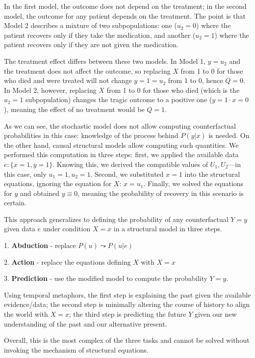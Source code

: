 \documentclass[fleqn]{article}
\numberwithin{equation}{section}
\numberwithin{theorem}{section}
\numberwithin{figure}{section}
\numberwithin{lemma}{section}
\numberwithin{corollary}{section}
\begin{document}
In the first model, the outcome does not depend on the treatment; in the second model, the outcome for any patient depends on the treatment. The point is that Model 2 describes a mixture of two subpopulations: one ($u_2 = 0$) where the patient recovers only if they take the medication, and another ($u_2 = 1$) where the patient recovers only if they are not given the medication.

The treatment effect differs between these two models. In Model 1, $y = u_2$ and the treatment does not affect the outcome, so replacing $X$ from 1 to 0 for those who died and were treated will not change $y = 1 = u_2$ from 1 to 0, hence $Q = 0$. In Model 2, however, replacing $X$ from 1 to 0 for those who died (which is the $u_2 = 1$ subpopulation) changes the tragic outcome to a positive one ($y = 1 \cdot x = 0$), meaning the effect of no treatment would be $Q = 1$.

As we can see, the stochastic model does not allow computing counterfactual probabilities in this case: knowledge of the process behind $P(y|x)$ is needed. On the other hand, causal structural models allow computing such quantities. We performed this computation in three steps: first, we applied the available data $e: \{x=1, y=1\}$. Knowing this, we derived the compatible values of $U_1, U_2$—in this case, only $u_1 = 1, u_2 = 1$. Second, we substituted $x=1$ into the structural equations, ignoring the equation for $X$: $x = u_1$. Finally, we solved the equations for $y$ and obtained $y \equiv 0$, meaning the probability of recovery in this scenario is certain.

This approach generalizes to defining the probability of any counterfactual $Y = y$ given data $e$ under condition $X=x$ in a structural model in three steps.

1. \textbf{Abduction} - replace $P(u) \leadsto P(u|e)$

2. \textbf{Action} - replace the equations defining $X$ with $X=x$

3. \textbf{Prediction} - use the modified model to compute the probability $Y = y$.

Using temporal metaphors, the first step is explaining the past given the available evidence/data; the second step is minimally altering the course of history to align the world with $X = x$; the third step is predicting the future $Y$ given our new understanding of the past and our alternative present.

Overall, this is the most complex of the three tasks and cannot be solved without invoking the mechanism of structural equations.
\end{document}
